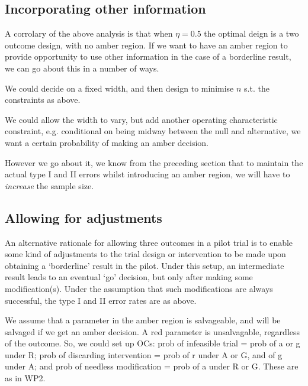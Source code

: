 \documentclass[sagev, Crown]{sagej} %
\begin{document}
\subsection{Incorporating other information}

A corrolary of the above analysis is that when $\eta = 0.5$ the optimal deign is a two outcome design, with no amber region. If we want to have an amber region to provide opportunity to use other information in the case of a borderline result, we can go about this in a number of ways. 

We could decide on a fixed width, and then design to minimise $n$ s.t. the constraints as above.

We could allow the width to vary, but add another operating characteristic constraint, e.g. conditional on being midway between the null and alternative, we want a certain probability of making an amber decision.

However we go about it, we know from the preceding section that to maintain the actual type I and II errors whilst introducing an amber region, we will have to \emph{increase} the sample size.

\subsection{Allowing for adjustments}

An alternative rationale for allowing three outcomes in a pilot trial is to enable some kind of adjustments to the trial design or intervention to be made upon obtaining a `borderline' result in the pilot. Under this setup, an intermediate result leads to an eventual `go' decision, but only after making some modification(s). Under the assumption that such modifications are always successful, the type I and II error rates are as above. 

We assume that a parameter in the amber region is salvageable, and will be salvaged if we get an amber decision. A red parameter is unsalvagable, regardless of the outcome. So, we could set up OCs: prob of infeasible trial = prob of a or g under R; prob of discarding intervention = prob of r under A or G, and of g under A; and prob of needless modification = prob of a under R or G. These are as in WP2. 
\end{document}
